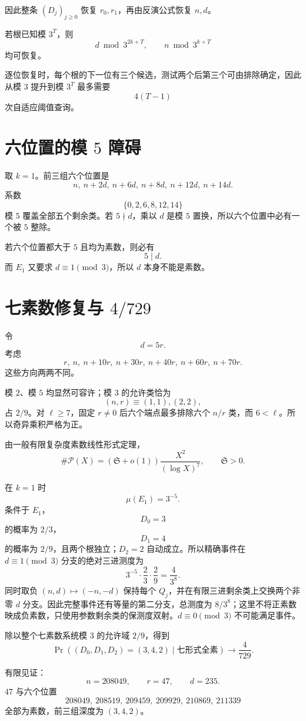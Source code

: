 \documentclass[11pt,a4paper]{ctexart}
\begin{document}
因此整条 \((D_j)_{j\ge0}\) 恢复 \(r_0,r_1\)，再由反演公式恢复 \(n,d\)。

若根已知模 \(3^T\)，则
\[
d\bmod3^{2k+T},
\qquad
n\bmod3^{k+T}
\]
均可恢复。

逐位恢复时，每个根的下一位有三个候选，测试两个后第三个可由排除确定，因此从模 \(3\) 提升到模 \(3^T\) 最多需要
\[
\boxed{4(T-1)}
\]
次自适应阈值查询。

\section{六位置的模 \(5\) 障碍}
取 \(k=1\)。前三组六个位置是
\[
n,\ n+2d,\ n+6d,\ n+8d,\ n+12d,\ n+14d.
\]
系数
\[
\{0,2,6,8,12,14\}
\]
模 \(5\) 覆盖全部五个剩余类。若 \(5\nmid d\)，乘以 \(d\) 是模 \(5\) 置换，所以六个位置中必有一个被 \(5\) 整除。

若六个位置都大于 \(5\) 且均为素数，则必有
\[
\boxed{5\mid d.}
\]
而 \(E_1\) 又要求 \(d\equiv1\pmod3\)，所以 \(d\) 本身不能是素数。

\section{七素数修复与 \(4/729\)}
令
\[
d=5r.
\]
考虑
\[
r,\ n,\ n+10r,\ n+30r,\ n+40r,\ n+60r,\ n+70r.
\]
这些方向两两不同。

模 \(2\)、模 \(5\) 均显然可容许；模 \(3\) 的允许类恰为
\[
(n,r)\equiv(1,1),(2,2),
\]
占 \(2/9\)。对 \(\ell\ge7\)，固定 \(r\ne0\) 后六个端点最多排除六个 \(n/r\) 类，而 \(6<\ell\)。所以奇异乘积严格为正。

由一般有限复杂度素数线性形式定理，
\[
\#\mathcal P(X)
=
(\mathfrak S+o(1))
\frac{X^2}{(\log X)^7},
\qquad \mathfrak S>0.
\]

在 \(k=1\) 时
\[
\mu(E_1)=3^{-5}.
\]
条件于 \(E_1\)，
\[
D_0=3
\]
的概率为 \(2/3\)，
\[
D_1=4
\]
的概率为 \(2/9\)，且两个根独立；\(D_2=2\) 自动成立。所以精确事件在 $d\equiv1\pmod3$ 分支的绝对三进测度为
\[
3^{-5}\cdot\frac23\cdot\frac29
=
\frac4{3^8}.
\]
同时取负 $(n,d)\mapsto(-n,-d)$ 保持每个 $Q_j$，并在有限三进剩余类上交换两个非零 $d$ 分支。因此完整事件还有等量的第二分支，总测度为 $8/3^8$；这里不将正素数映成负素数，只使用参数剩余类的保测度双射。$d\equiv0\pmod3$ 不可能满足事件。

除以整个七素数系统模 \(3\) 的允许域 \(2/9\)，得到
\[
\boxed{
\Pr((D_0,D_1,D_2)=(3,4,2)\mid\text{七形式全素})
\to\frac4{729}.
}
\]

有限见证：
\[
n=208049,\qquad r=47,\qquad d=235.
\]
\(47\) 与六个位置
\[
208049,\ 208519,\ 209459,\ 209929,\ 210869,\ 211339
\]
全部为素数，前三组深度为 \((3,4,2)\)。
\end{document}
